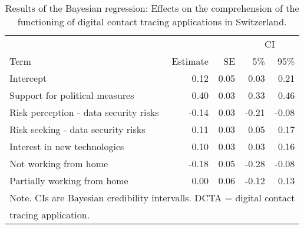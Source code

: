 \begin{table}[!h]

\caption{\label{tab:tab_results_compreh_score}Results of the Bayesian regression: Effects on the comprehension of the functioning of digital contact tracing applications in Switzerland.}
\centering
\begin{tabular}[t]{lrrrr}
\toprule
\multicolumn{1}{c}{} & \multicolumn{1}{c}{} & \multicolumn{1}{c}{} & \multicolumn{2}{c}{CI} \\
\cmidrule(l{3pt}r{3pt}){4-5}
Term & Estimate & SE & 5\% & 95\%\\
\midrule
Intercept & 0.12 & 0.05 & 0.03 & 0.21\\
Support for political measures & 0.40 & 0.03 & 0.33 & 0.46\\
Risk perception - data security risks & -0.14 & 0.03 & -0.21 & -0.08\\
Risk seeking - data security risks & 0.11 & 0.03 & 0.05 & 0.17\\
Interest in new technologies & 0.10 & 0.03 & 0.03 & 0.16\\
\addlinespace
Not working from home & -0.18 & 0.05 & -0.28 & -0.08\\
Partially working from home & 0.00 & 0.06 & -0.12 & 0.13\\
\bottomrule
\multicolumn{5}{l}{\textsuperscript{} Note. CIs are Bayesian credibility intervalls. DCTA = digital contact}\\
\multicolumn{5}{l}{tracing application.}\\
\end{tabular}
\end{table}
